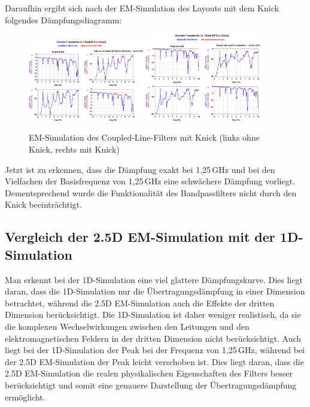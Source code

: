     Daraufhin ergibt sich nach der EM-Simulation des Layouts mit dem Knick folgendes Dämpfungsdiagramm:
    \begin{figure}[H]
        \centering
        \includegraphics[width=0.45\textwidth]{Pictures/EMSimulationohneKnick.png}
        \includegraphics[width=0.45\textwidth]{Pictures/EMSimulationmitKnick.png}
        \caption{EM-Simulation des Coupled-Line-Filters mit Knick (links ohne Knick, rechts mit Knick)}
    \end{figure}

    Jetzt ist zu erkennen, dass die Dämpfung exakt bei 1,25\,GHz und bei den Vielfachen der Basisfrequenz von 1,25\,GHz eine schwächere Dämpfung vorliegt. Dementsprechend wurde die Funktionalität des Bandpassfilters nicht durch den Knick beeinträchtigt.


\subsection{Vergleich der 2.5D EM-Simulation mit der 1D-Simulation}
Man erkennt bei der 1D-Simulation eine viel glattere Dämpfungskurve. Dies liegt daran, dass die 1D-Simulation nur die Übertragungsdämpfung in einer Dimension betrachtet, während die 2.5D EM-Simulation auch die Effekte der dritten Dimension berücksichtigt.
Die 1D-Simulation ist daher weniger realistisch, da sie die komplexen Wechselwirkungen zwischen den Leitungen und den elektromagnetischen Feldern in der dritten Dimension nicht berücksichtigt.
Auch liegt bei der 1D-Simulation der Peak bei der Frequenz von 1,25\,GHz, während bei der 2.5D EM-Simulation der Peak leicht verschoben ist. Dies liegt daran, dass die 2.5D EM-Simulation die realen physikalischen Eigenschaften des Filters besser berücksichtigt und somit eine genauere Darstellung der Übertragungsdämpfung ermöglicht.

